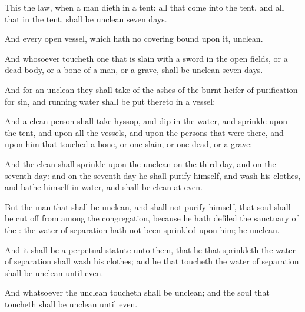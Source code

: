 {This
{} the
law, when a
man
dieth in a
tent: all that
come into the
tent, and all that
{} in the
tent, shall be
unclean
seven
days.

And every
open
vessel, which hath no
covering
bound upon it,
{}
unclean.

And whosoever
toucheth one that is
slain with a
sword in the
open
fields, or a dead
body, or a
bone of a
man, or a
grave, shall be
unclean
seven
days.

And for an
unclean
{} they shall
take of the
ashes of the burnt
heifer of purification for
sin, and
running
water shall be
put thereto in a
vessel:

And a
clean
person shall
take
hyssop, and
dip
{} in the
water, and
sprinkle
{} upon the
tent, and upon all the
vessels, and upon the
persons that were there, and upon him that
touched a
bone, or one
slain, or one
dead, or a
grave:

And the
clean
{} shall
sprinkle upon the
unclean on the
third
day, and on the
seventh
day: and on the
seventh
day he shall
purify himself, and
wash his
clothes, and
bathe himself in
water, and shall be
clean at
even.

But the
man that shall be
unclean, and shall not
purify himself, that
soul shall be cut
off from
among the
congregation, because he hath
defiled the
sanctuary of the
{}: the
water of
separation hath not been
sprinkled upon him; he
{}
unclean.

And it shall be a
perpetual
statute unto them, that he that
sprinkleth the
water of
separation shall
wash his
clothes; and he that
toucheth the
water of
separation shall be
unclean until
even.

And whatsoever the
unclean
{}
toucheth shall be
unclean; and the
soul that
toucheth
{} shall be
unclean until
even.




\par }
